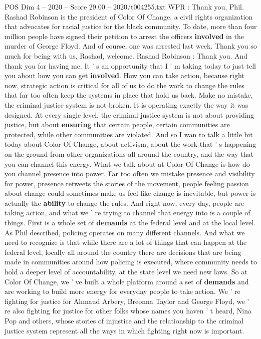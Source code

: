 \begin{textsample}{POS Dim 4 – 2020 – Score 29.00 – 2020/t004255.txt}
WPR : Thank you, Phil.
Rashad Robinson is the president of Color Of Change, a civil rights organization that advocates for racial justice for the black community.
To date, more than four million people have signed their petition to arrest the officers \textbf{involved} in the murder of George Floyd.
And of course, one was arrested last week.
Thank you so much for being with us, Rashad, welcome.
Rashad Robinson : Thank you.
And thank you for having me.
It ' s an opportunity that I ' m taking today to just tell you about how you can get \textbf{involved}.
How you can take action, because right now, strategic action is critical for all of us to do the work to change the rules that far too often keep the systems in place that hold us back.
Make no mistake, the criminal justice system is not broken.
It is operating exactly the way it was designed.
At every single level, the criminal justice system is not about providing justice, but about \textbf{ensuring} that certain people, certain communities are protected, while other communities are violated.
And so I wan to talk a little bit today about Color Of Change, about activism, about the work that ' s happening on the ground from other organizations all around the country, and the way that you can channel this energy.
What we talk about at Color Of Change is how do you channel presence into power.
Far too often we mistake presence and visibility for power, presence retweets the stories of the movement, people feeling passion about change could sometimes make us feel like change is inevitable, but power is actually the \textbf{ability} to change the rules.
And right now, every day, people are taking action, and what we ' re trying to channel that energy into is a couple of things.
First is a whole set of \textbf{demands} at the federal level and at the local level.
As Phil described, policing operates on many different channels.
And what we need to recognize is that while there are a lot of things that can happen at the federal level, locally all around the country there are decisions that are being made in communities around how policing is executed, where community needs to hold a deeper level of accountability, at the state level we need new laws.
So at Color Of Change, we ' ve built a whole platform around a set of \textbf{demands} and are working to build more energy for everyday people to take action.
We ' re fighting for justice for Ahmaud Arbery, Breonna Taylor and George Floyd, we ' re also fighting for justice for other folks whose names you haven ' t heard, Nina Pop and others, whose stories of injustice and the relationship to the criminal justice system represent all the ways in which fighting right now is important.

\end{textsample}
